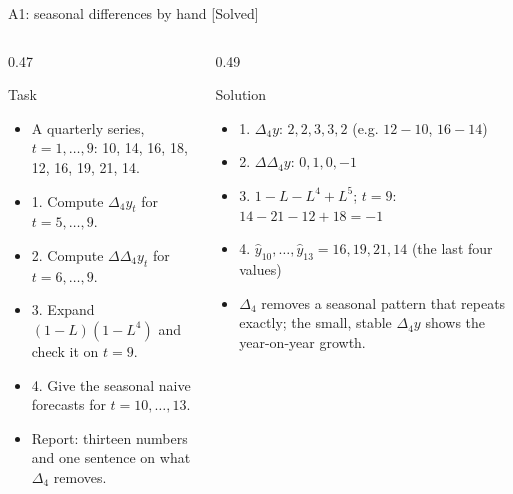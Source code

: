 \begin{frame}{A1: seasonal differences by hand [Solved]}
\itemsize{\scriptsize}
\begin{columns}[T]
\begin{column}{0.47\textwidth}
\begin{block}{Task}
\begin{itemize}
    \item A quarterly series, $t = 1, \dots, 9$: 10, 14, 16, 18, 12, 16, 19, 21, 14.
    \item 1. Compute $\Delta_4 y_t$ for $t = 5, \dots, 9$.
    \item 2. Compute $\Delta\Delta_4 y_t$ for $t = 6, \dots, 9$.
    \item 3. Expand $(1 - L)(1 - L^4)$ and check it on $t = 9$.
    \item 4. Give the seasonal naive forecasts for $t = 10, \dots, 13$.
    \item Report: thirteen numbers and one sentence on what $\Delta_4$ removes.
\end{itemize}
\end{block}
\end{column}
\begin{column}{0.49\textwidth}
\begin{exampleblock}{Solution}
\begin{itemize}
    \item 1. $\Delta_4 y$: $2, 2, 3, 3, 2$ (e.g. $12 - 10$, $16 - 14$)
    \item 2. $\Delta\Delta_4 y$: $0, 1, 0, -1$
    \item 3. $1 - L - L^4 + L^5$; $t = 9$: $14 - 21 - 12 + 18 = -1$
    \item 4. $\hat y_{10}, \dots, \hat y_{13} = 16, 19, 21, 14$ (the last four values)
    \item $\Delta_4$ removes a seasonal pattern that repeats exactly; the small, stable $\Delta_4 y$ shows the year-on-year growth.
\end{itemize}
\end{exampleblock}
\end{column}
\end{columns}
\end{frame}

